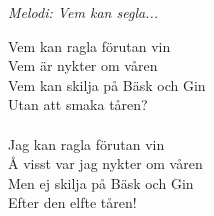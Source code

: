 {\footnotesize\textit{Melodi: Vem kan segla...}}\par
\vspace{10pt}
Vem kan ragla förutan vin\\
Vem är nykter om våren\\
Vem kan skilja på Bäsk och Gin\\
Utan att smaka tåren?\\
\\
Jag kan ragla förutan vin\\
Å visst var jag nykter om våren\\
Men ej skilja på Bäsk och Gin\\
Efter den elfte tåren!
